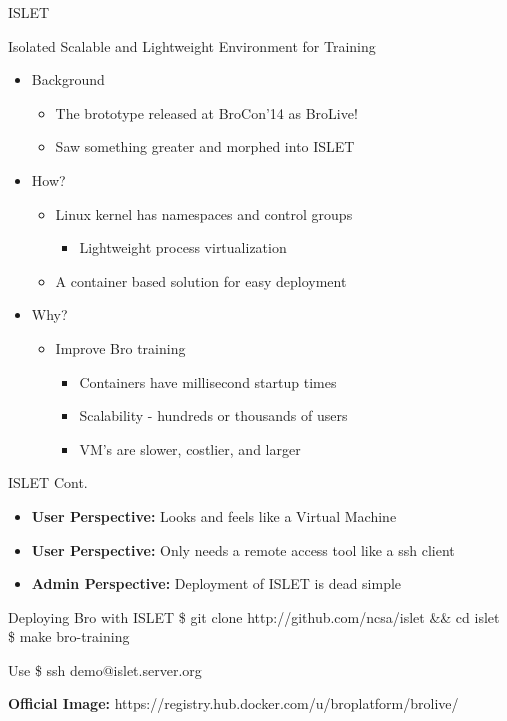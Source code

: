 \documentclass[xcolor=svgnames,handout]{beamer}
\begin{document}
\begin{frame}{ISLET}
  \begin{block}{Isolated Scalable and Lightweight Environment for Training}
    \begin{itemize}
      \item Background
    	\begin{itemize}
		\item The brototype released at BroCon'14 as BroLive!
                \item Saw something greater and morphed into ISLET
    	\end{itemize}
      \item How?
    	\begin{itemize}
		\item Linux kernel has namespaces and control groups
    	        \begin{itemize}
		  \item Lightweight process virtualization
    	        \end{itemize}
		\item A container based solution for easy deployment
    	\end{itemize}
      \item Why?
    	\begin{itemize}
		\item Improve Bro training
    	        \begin{itemize}
		  \item Containers have millisecond startup times
		  \item Scalability - hundreds or thousands of users
		  \item VM's are slower, costlier, and larger
    	        \end{itemize}
    	\end{itemize}
    \end{itemize}
  \end{block}
\end{frame}

\begin{frame}{ISLET Cont.}
  \begin{itemize}
    \item \textbf{User Perspective:} Looks and feels like a Virtual Machine
    \item \textbf{User Perspective:} Only needs a remote access tool like a ssh client
    \item \textbf{Admin Perspective:} Deployment of ISLET is dead simple
  \end{itemize}
    \begin{exampleblock}{Deploying Bro with ISLET}
	\alert{\$ git clone http://github.com/ncsa/islet \&\& cd islet} \\
        \alert{\$ make bro-training}
    \end{exampleblock}
    \begin{exampleblock}{Use}
	\alert{\$ ssh demo@islet.server.org} \\
    \end{exampleblock}
    \item \textbf{Official Image:} https://registry.hub.docker.com/u/broplatform/brolive/
\end{frame}
\end{document}
